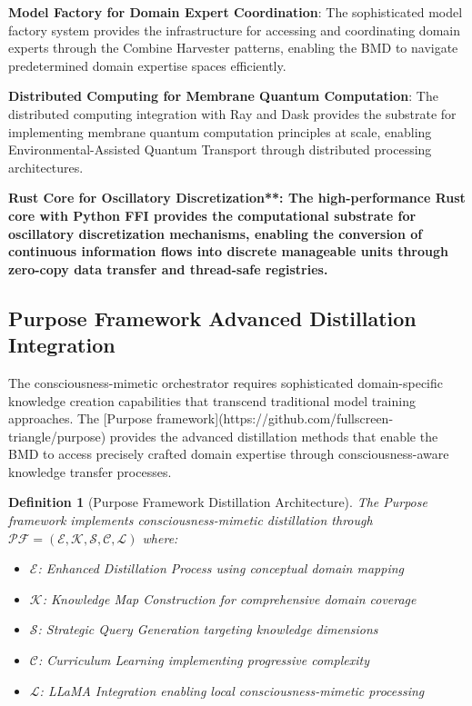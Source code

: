 \documentclass[12pt,a4paper]{article}
\newtheorem{definition}[theorem]{Definition}
\begin{document}
\textbf{Model Factory for Domain Expert Coordination}: The sophisticated model factory system provides the infrastructure for accessing and coordinating domain experts through the Combine Harvester patterns, enabling the BMD to navigate predetermined domain expertise spaces efficiently.

\textbf{Distributed Computing for Membrane Quantum Computation}: The distributed computing integration with Ray and Dask provides the substrate for implementing membrane quantum computation principles at scale, enabling Environmental-Assisted Quantum Transport through distributed processing architectures.

\textbf{Rust Core for Oscillatory Discretization**: The high-performance Rust core with Python FFI provides the computational substrate for oscillatory discretization mechanisms, enabling the conversion of continuous information flows into discrete manageable units through zero-copy data transfer and thread-safe registries.}

\subsection{Purpose Framework Advanced Distillation Integration}

The consciousness-mimetic orchestrator requires sophisticated domain-specific knowledge creation capabilities that transcend traditional model training approaches. The [Purpose framework](https://github.com/fullscreen-triangle/purpose) provides the advanced distillation methods that enable the BMD to access precisely crafted domain expertise through consciousness-aware knowledge transfer processes.

\begin{definition}[Purpose Framework Distillation Architecture]
The Purpose framework implements consciousness-mimetic distillation through $\mathcal{PF} = (\mathcal{E}, \mathcal{K}, \mathcal{S}, \mathcal{C}, \mathcal{L})$ where:
\begin{itemize}
\item $\mathcal{E}$: Enhanced Distillation Process using conceptual domain mapping
\item $\mathcal{K}$: Knowledge Map Construction for comprehensive domain coverage
\item $\mathcal{S}$: Strategic Query Generation targeting knowledge dimensions
\item $\mathcal{C}$: Curriculum Learning implementing progressive complexity
\item $\mathcal{L}$: LLaMA Integration enabling local consciousness-mimetic processing
\end{itemize}
\end{definition}
\end{document}
